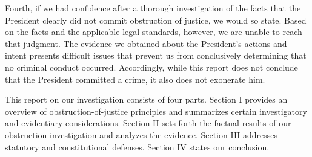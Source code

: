 Fourth, if we had confidence after a thorough investigation of the facts that the President clearly did not commit obstruction of justice, we would so state.
Based on the facts and the applicable legal standards, however, we are unable to reach that judgment.
The evidence we obtained about the President’s actions and intent presents difficult issues that prevent us from
conclusively determining that no criminal conduct occurred.
Accordingly, while this report does not conclude that the President committed a crime, it also does not exonerate him.

\hr

This report on our investigation consists of four parts.
Section I provides an overview of obstruction-of-justice principles and summarizes certain investigatory and evidentiary considerations.
Section II sets forth the factual results of our obstruction investigation and analyzes the evidence.
Section III addresses statutory and constitutional defenses.
Section IV states our conclusion.
